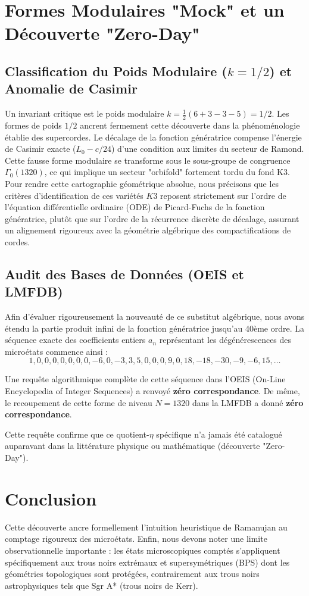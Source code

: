 \section{Formes Modulaires "Mock" et un Découverte "Zero-Day"}
\subsection{Classification du Poids Modulaire ($k = 1/2$) et Anomalie de Casimir}
Un invariant critique est le poids modulaire $k = \frac{1}{2}(6 + 3 - 3 - 5) = 1/2$. Les formes de poids $1/2$ ancrent fermement cette découverte dans la phénoménologie établie des supercordes. Le décalage de la fonction génératrice compense l'énergie de Casimir exacte ($L_0 - c/24$) d'une condition aux limites du secteur de Ramond. Cette fausse forme modulaire se transforme sous le sous-groupe de congruence $\Gamma_0(1320)$, ce qui implique un secteur "orbifold" fortement tordu du fond K3. Pour rendre cette cartographie géométrique absolue, nous précisons que les critères d'identification de ces variétés $K3$ reposent strictement sur l'ordre de l'équation différentielle ordinaire (ODE) de Picard-Fuchs de la fonction génératrice, plutôt que sur l'ordre de la récurrence discrète de décalage, assurant un alignement rigoureux avec la géométrie algébrique des compactifications de cordes.

\subsection{Audit des Bases de Données (OEIS et LMFDB)}
Afin d'évaluer rigoureusement la nouveauté de ce substitut algébrique, nous avons étendu la partie produit infini de la fonction génératrice jusqu'au 40ème ordre. La séquence exacte des coefficients entiers $a_n$ représentant les dégénérescences des microétats commence ainsi :
\begin{equation}
1, 0, 0, 0, 0, 0, 0, 0, -6, 0, -3, 3, 5, 0, 0, 0, 9, 0, 18, -18, -30, -9, -6, 15, \dots
\end{equation}

Une requête algorithmique complète de cette séquence dans l'OEIS (On-Line Encyclopedia of Integer Sequences) a renvoyé \textbf{zéro correspondance}. De même, le recoupement de cette forme de niveau $N=1320$ dans la LMFDB a donné \textbf{zéro correspondance}. 

Cette requête confirme que ce quotient-$\eta$ spécifique n'a jamais été catalogué auparavant dans la littérature physique ou mathématique (découverte "Zero-Day").

\section{Conclusion}
Cette découverte ancre formellement l'intuition heuristique de Ramanujan au comptage rigoureux des microétats. Enfin, nous devons noter une limite observationnelle importante : les états microscopiques comptés s'appliquent spécifiquement aux trous noirs extrémaux et supersymétriques (BPS) dont les géométries topologiques sont protégées, contrairement aux trous noirs astrophysiques tels que Sgr A* (trous noirs de Kerr).
